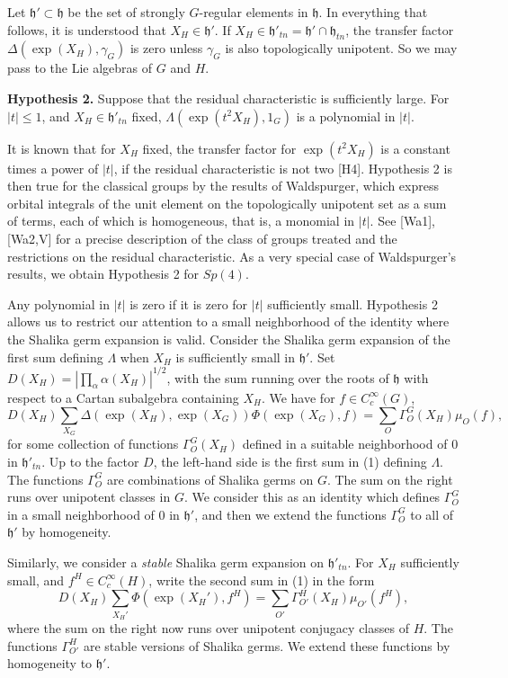 \documentclass{amsart}
\newcommand\h{{\mathfrak h}}
\begin{document}
Let $\h'\subset \h$ be the set of strongly $G$-regular elements in
$\h$.  In everything that follows, it is understood that $X_H\in \h'$.
If $X_H\in \h'_{tn} = \h'\cap \h_{tn}$, the transfer factor
$\Delta(\exp(X_H),\gamma_G)$ is zero unless $\gamma_G$ is also
topologically unipotent.  So we may pass to the Lie algebras of $G$
and $H$.

{\bf Hypothesis 2.}  Suppose that the residual characteristic is
sufficiently large.  For $|t|\le 1$, and $X_H\in \h'_{tn}$ fixed,
$\Lambda(\exp(t^2 X_H),1_G)$ is a polynomial in $|t|$.

It is known that for $X_H$ fixed, the transfer factor for $\exp(t^2
X_H)$ is a constant times a power of $|t|$, if the residual
characteristic is not two [H4].  Hypothesis 2 is then true for the
classical groups by the results of Waldspurger, which express orbital
integrals of the unit element on the topologically unipotent set as a
sum of terms, each of which is homogeneous, that is, a monomial in
$|t|$.  See [Wa1], [Wa2,V] for a precise description of the class of
groups treated and the restrictions on the residual characteristic.
As a very special case of Waldspurger's results, we obtain Hypothesis
2 for $Sp(4)$.

Any polynomial in $|t|$ is zero if it is zero for $|t|$ sufficiently
small.  Hypothesis 2 allows us to restrict our attention to a small
neighborhood of the identity where the Shalika germ expansion is
valid.  Consider the Shalika germ expansion of the first sum defining
$\Lambda$ when $X_H$ is sufficiently small in $\h'$.  Set $D(X_H) =
|\prod_\alpha \alpha(X_H)|^{1/2}$, with the sum running over the roots
of $\h$ with respect to a Cartan subalgebra containing $X_H$.  We have
for $f\in C_c^\infty(G)$,
$$D(X_H)\sum_{X_G} \Delta(\exp(X_H),\exp(X_G))\Phi(\exp(X_G),f)=
\sum_{O} \Gamma^G_O(X_H)\mu_O(f),$$ 
for some collection of functions
$\Gamma_{O}^G(X_H)$ defined in a suitable neighborhood of $0$ in
$\h'_{tn}$.  Up to the factor $D$, the left-hand side is the first sum
in (1) defining $\Lambda$.  The functions $\Gamma^G_O$ are
combinations of Shalika germs on $G$.  The sum on the right runs over
unipotent classes in $G$.  We consider this as an identity which
defines $\Gamma_O^G$ in a small neighborhood of $0$ in $\h'$, and then
we extend the functions $\Gamma_O^G$ to all of $\h'$ by homogeneity.

Similarly, we consider a {\it stable} Shalika germ expansion on
$\h'_{tn}$.  For $X_H$ sufficiently small, and $f^H\in C_c^\infty(H)$,
write the second sum in (1) in the form
$$D(X_H)\sum_{X_H'} \Phi(\exp(X_H'),f^H) = \sum_{O'}
\Gamma_{O'}^H (X_H)\mu_{O'} (f^H),$$
where the sum on the right
now runs over unipotent conjugacy classes of $H$.
The functions $\Gamma_{O'}^H$ are stable versions of
Shalika germs.
We extend these functions by homogeneity to $\h'$.
\end{document}
